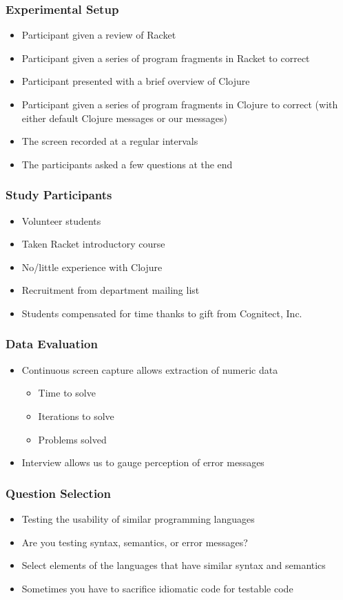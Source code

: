 \documentclass{beamer}
\begin{document}
\begin{frame}
\frametitle{Experimental Setup}
	\begin{itemize}
		\item Participant given a review of Racket
		\item Participant given a series of program fragments in Racket to correct
		\item Participant presented with a brief overview of Clojure
		\item Participant given a series of  program fragments in Clojure to correct (with either default Clojure messages or our messages) 
		\item The screen recorded at a regular intervals
		\item The participants asked a few questions at the end
	\end{itemize}
\end{frame}

\begin{frame}
\frametitle{Study Participants}
	\begin{itemize}
		\item Volunteer students
		\item Taken Racket introductory course
		\item No/little experience with Clojure
		\item Recruitment from department mailing list
		\item Students compensated for time thanks to gift from Cognitect, Inc.
	\end{itemize}
\end{frame}

\begin{frame}
\frametitle{Data Evaluation}
	\begin{itemize}
		\item Continuous screen capture allows extraction of numeric data
			\begin{itemize}
				\item Time to solve
				\item Iterations to solve
				\item Problems solved
			\end{itemize}
		\item Interview allows us to gauge perception of error messages
	\end{itemize}
\end{frame}


\begin{frame}
\frametitle{Question Selection}
	\begin{itemize}
		\item Testing the usability of similar programming languages
		\item Are you testing syntax, semantics, or error messages?
		\item Select elements of the languages that have similar syntax and semantics
		\item Sometimes you have to sacrifice idiomatic code for testable code
	\end{itemize}
\end{frame}
\end{document}

